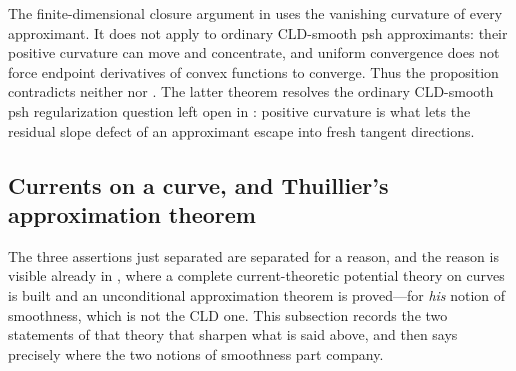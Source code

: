 The finite-dimensional closure argument in
 uses the vanishing
curvature of every approximant.  It does not apply to ordinary CLD-smooth psh
approximants: their positive curvature can move and concentrate, and uniform
convergence does not force endpoint derivatives of convex functions to
converge.  Thus the proposition contradicts neither
\cite[Proposition~15.11]{GJR26} nor
.  The latter theorem
resolves the ordinary CLD-smooth psh regularization question left open in
\cite[Remark~5.5]{Wanner19}: positive curvature is what lets the residual
slope defect of an approximant escape into fresh tangent directions.

\subsection{Currents on a curve, and Thuillier's approximation theorem}
\label{sec:ch19-thuillier-currents}

The three assertions just separated are separated for a reason, and the
reason is visible already in \cite{Thu05}, where a complete
current-theoretic potential theory on curves is built and an unconditional
approximation theorem is proved---for \emph{his} notion of smoothness, which
is not the CLD one.  This subsection records the two statements of that
theory that sharpen what is said above, and then says precisely where the
two notions of smoothness part company.

